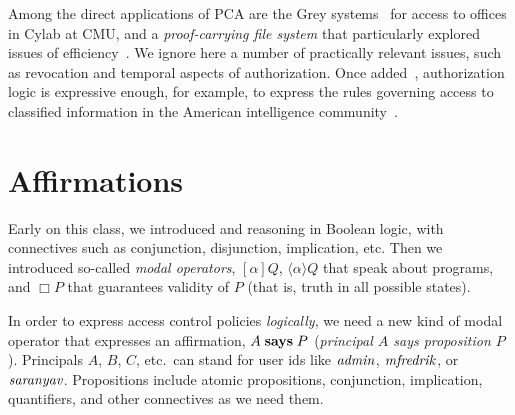 \documentclass[11pt]{article}
\begin{document}
Among the direct applications of PCA are the Grey systems~\citep{Bauer05isc} for
access to offices in Cylab at CMU, and a \emph{proof-carrying file system} that
particularly explored issues of efficiency~\citep{Garg09phd,Garg10oakland}.  We
ignore here a number of practically relevant issues, such as revocation and
temporal aspects of authorization.  Once added~\citep{DeYoung07tr},
authorization logic is expressive enough, for example, to express the rules
governing access to classified information in the American intelligence
community~\citep{Garg09trpolicy}.

\section{Affirmations}

Early on this class, we introduced and reasoning in Boolean logic, with
connectives such as conjunction, disjunction, implication, etc.  Then we
introduced so-called \emph{modal operators}, $[\alpha]Q$,
$\langle\alpha\rangle Q$ that speak about programs, and $\Box P$ that guarantees
validity of $P$ (that is, truth in all possible states).

In order to express access control policies \emph{logically}, we need a new kind
of modal operator that expresses an affirmation, $A \mathrel{\mathbf{says}} P$ (\emph{principal
  $A$ says proposition $P$}).  Principals $A$, $B$, $C$, etc.\ can stand for
user ids like $\mathit{admin}$, $\mathit{mfredrik}$, or $\mathit{saranyav}$. Propositions include
atomic propositions, conjunction, implication, quantifiers, and other
connectives as we need them.
\end{document}
